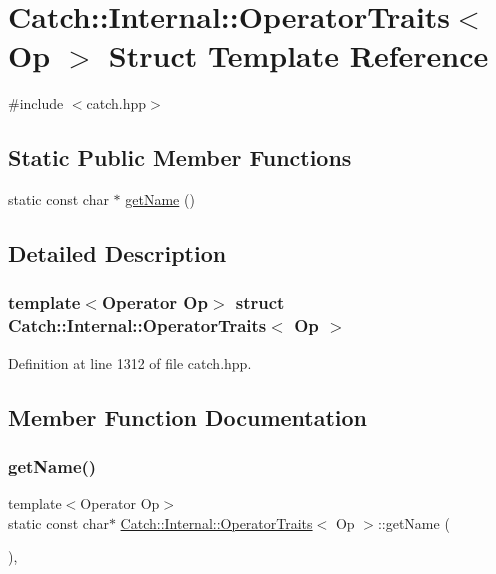 \hypertarget{struct_catch_1_1_internal_1_1_operator_traits}{}\section{Catch\+:\+:Internal\+:\+:Operator\+Traits$<$ Op $>$ Struct Template Reference}
\label{struct_catch_1_1_internal_1_1_operator_traits}


{\ttfamily \#include $<$catch.\+hpp$>$}

\subsection*{Static Public Member Functions}
\begin{DoxyCompactItemize}
\item 
static const char $\ast$ \hyperlink{struct_catch_1_1_internal_1_1_operator_traits_ac6d08082ea33348d42bc4ccbd6d07671}{get\+Name} ()
\end{DoxyCompactItemize}


\subsection{Detailed Description}
\subsubsection*{template$<$Operator Op$>$\newline
struct Catch\+::\+Internal\+::\+Operator\+Traits$<$ Op $>$}



Definition at line 1312 of file catch.\+hpp.



\subsection{Member Function Documentation}
\hypertarget{struct_catch_1_1_internal_1_1_operator_traits_ac6d08082ea33348d42bc4ccbd6d07671}{}\label{struct_catch_1_1_internal_1_1_operator_traits_ac6d08082ea33348d42bc4ccbd6d07671} 
\subsubsection{\texorpdfstring{get\+Name()}{getName()}}
{\footnotesize\ttfamily template$<$Operator Op$>$ \\
static const char$\ast$ \hyperlink{struct_catch_1_1_internal_1_1_operator_traits}{Catch\+::\+Internal\+::\+Operator\+Traits}$<$ Op $>$\+::get\+Name (\begin{DoxyParamCaption}{ }\end{DoxyParamCaption})\hspace{0.3cm}{\ttfamily [inline]}, {\ttfamily [static]}}




